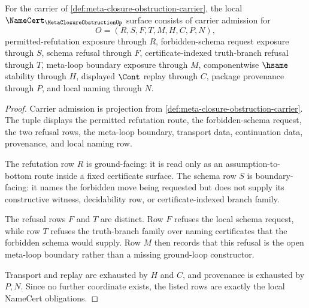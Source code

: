 \begin{theorem}
\label{thm:meta-closure-obstruction-namecert-obligations}
For the carrier of \autoref{def:meta-closure-obstruction-carrier}, the local $\NameCert_{\MetaClosureObstructionUp}$ surface consists of carrier admission for
$$
O=(R,S,F,T,M,H,C,P,N),
$$
permitted-refutation exposure through $R$, forbidden-schema request exposure through $S$, schema refusal through $F$, certificate-indexed truth-branch refusal through $T$, meta-loop boundary exposure through $M$, componentwise $\hsame$ stability through $H$, displayed $\Cont$ replay through $C$, package provenance through $P$, and local naming through $N$.
\end{theorem}
\begin{proof}
Carrier admission is projection from \autoref{def:meta-closure-obstruction-carrier}. The tuple displays the permitted refutation route, the forbidden-schema request, the two refusal rows, the meta-loop boundary, transport data, continuation data, provenance, and local naming row.

The refutation row $R$ is ground-facing: it is read only as an assumption-to-bottom route inside a fixed certificate surface. The schema row $S$ is boundary-facing: it names the forbidden move being requested but does not supply its constructive witness, decidability row, or certificate-indexed branch family.

The refusal rows $F$ and $T$ are distinct. Row $F$ refuses the local schema request, while row $T$ refuses the truth-branch family over naming certificates that the forbidden schema would supply. Row $M$ then records that this refusal is the open meta-loop boundary rather than a missing ground-loop constructor.

Transport and replay are exhausted by $H$ and $C$, and provenance is exhausted by $P,N$. Since no further coordinate exists, the listed rows are exactly the local NameCert obligations.
\end{proof}

